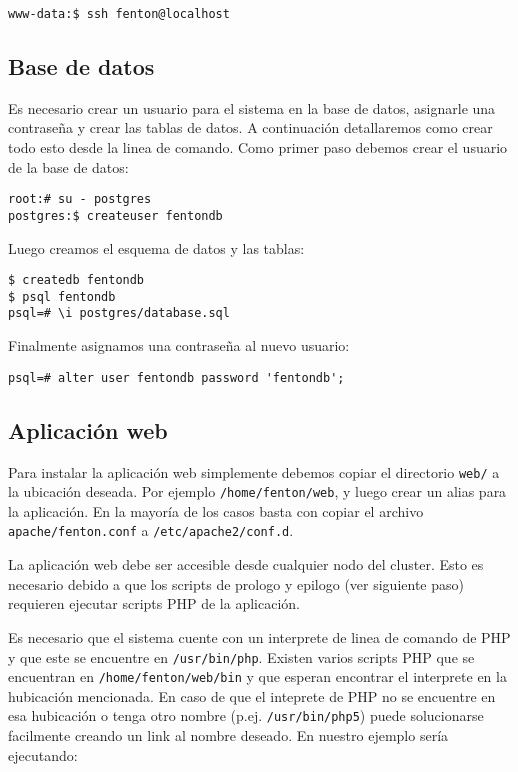 \documentclass[a4paper,10pt,spanish]{article}
\begin{document}
\begin{verbatim}
www-data:$ ssh fenton@localhost
\end{verbatim}

\subsection{Base de datos}

Es necesario crear un usuario para el sistema en la base de datos, asignarle una contrase\~{n}a y crear las tablas de datos. A continuaci\'{o}n detallaremos como crear todo esto desde la linea de comando. Como primer paso debemos crear el usuario de la base de datos:

\begin{verbatim}
root:# su - postgres 
postgres:$ createuser fentondb 
\end{verbatim}

Luego creamos el esquema de datos y las tablas:

\begin{verbatim}
$ createdb fentondb 
$ psql fentondb
psql=# \i postgres/database.sql
\end{verbatim}

Finalmente asignamos una contrase\~{n}a al nuevo usuario:

\begin{verbatim}
psql=# alter user fentondb password 'fentondb';
\end{verbatim}

\subsection{Aplicaci\'{o}n web}

Para instalar la aplicaci\'{o}n web simplemente debemos copiar el directorio \mbox{\texttt{web/}} a la ubicaci\'{o}n deseada. Por ejemplo \mbox{\texttt{/home/fenton/web}}, y luego crear un alias para la aplicaci\'{o}n. En la mayor\'{i}a de los casos basta con copiar el archivo \mbox{\texttt{apache/fenton.conf}} a \mbox{\texttt{/etc/apache2/conf.d}}.

La aplicaci\'{o}n web debe ser accesible desde cualquier nodo del cluster. Esto es necesario debido a que los scripts de prologo y epilogo (ver siguiente paso) requieren ejecutar scripts PHP de la aplicaci\'{o}n.

Es necesario que el sistema cuente con un interprete de linea de comando de PHP y que este se encuentre en \mbox{\texttt{/usr/bin/php}}. Existen varios scripts PHP que se encuentran en \mbox{\texttt{/home/fenton/web/bin}} y que esperan encontrar el interprete en la hubicaci\'{o}n mencionada. En caso de que el inteprete de PHP no se encuentre en esa hubicaci\'{o}n o tenga otro nombre (p.ej. \mbox{\texttt{/usr/bin/php5}}) puede solucionarse facilmente creando un link al nombre deseado. En nuestro ejemplo ser\'{i}a ejecutando:
\end{document}
